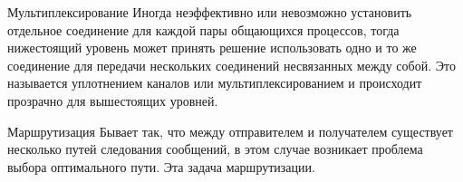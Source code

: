 \begin{frame}{Мультиплексирование}
	Иногда неэффективно или невозможно установить отдельное соединение для каждой пары общающихся процессов,  тогда нижестоящий уровень может принять решение использовать одно и то же соединение для передачи нескольких соединений несвязанных между собой. Это называется уплотнением каналов или мультиплексированием и происходит прозрачно для вышестоящих уровней.
\end{frame}

\begin{frame}{Маршрутизация}
	Бывает так,  что между отправителем и получателем существует несколько путей следования сообщений,  в этом случае возникает проблема выбора оптимального пути. Эта задача маршрутизации.
\end{frame}




